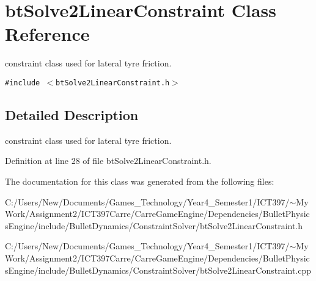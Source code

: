 \hypertarget{classbt_solve2_linear_constraint}{
\section{btSolve2LinearConstraint Class Reference}
\label{classbt_solve2_linear_constraint}
}
constraint class used for lateral tyre friction.  


{\tt \#include $<$btSolve2LinearConstraint.h$>$}



\subsection{Detailed Description}
constraint class used for lateral tyre friction. 

Definition at line 28 of file btSolve2LinearConstraint.h.

The documentation for this class was generated from the following files:\begin{CompactItemize}
\item 
C:/Users/New/Documents/Games\_\-Technology/Year4\_\-Semester1/ICT397/$\sim$My Work/Assignment2/ICT397Carre/CarreGameEngine/Dependencies/BulletPhysicsEngine/include/BulletDynamics/ConstraintSolver/btSolve2LinearConstraint.h\item 
C:/Users/New/Documents/Games\_\-Technology/Year4\_\-Semester1/ICT397/$\sim$My Work/Assignment2/ICT397Carre/CarreGameEngine/Dependencies/BulletPhysicsEngine/include/BulletDynamics/ConstraintSolver/btSolve2LinearConstraint.cpp\end{CompactItemize}

